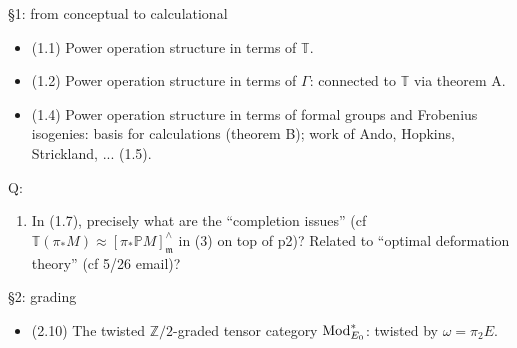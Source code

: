 \documentclass{rs}
\theoremstyle{definition}
\theoremstyle{remark}
\newcommand{\mb}[1]{\mathbb{#1}}
\newcommand{\mf}[1]{\mathfrak{#1}}
\renewcommand{\=}{\approx}
\renewcommand{\-}{\sim}
\numberwithin{equation}{section}
\numberwithin{thm}{section}
\begin{document}
\S 1: from conceptual to calculational
\begin{itemize}
 \item (1.1) Power operation structure in terms of $\mb T$.

 \item (1.2) Power operation structure in terms of $\Gamma$: connected to $\mb T$ via theorem A.

 \item (1.4) Power operation structure in terms of formal groups and Frobenius isogenies: basis for calculations (theorem B); work of Ando, Hopkins, Strickland, ... (1.5).
\end{itemize}
Q:
\begin{enumerate}
 \item In (1.7), precisely what are the ``completion issues'' (cf ${\mb T}(\pi_* M) \approx [\pi_* {\mb P} M]_{\mf m}^\wedge$ in (3) on top of p2)? 
 Related to ``optimal deformation theory'' (cf 5/26 email)?
\end{enumerate}

\S 2: grading
\begin{itemize}
 \item (2.10) The twisted ${\mb Z}/2$-graded tensor category ${\rm Mod}_{E_0}^*$: twisted by $\omega = \pi_2 E$.
\end{itemize}
\end{document}
